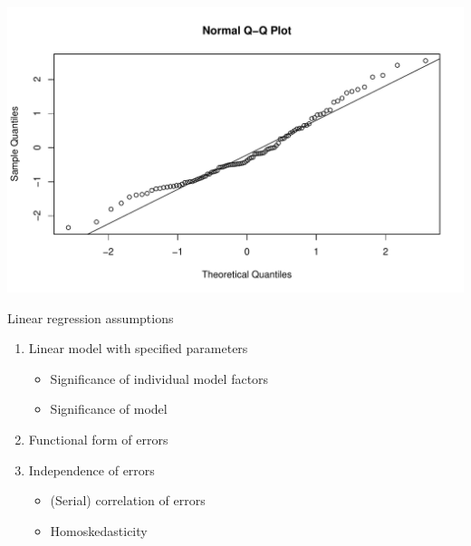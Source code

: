 \documentclass[xcolor=dvipsnames]{beamer}\usepackage{graphicx, color}
\makeatletter
\def\maxwidth{ %
  \ifdim\Gin@nat@width>\linewidth
    \linewidth
  \else
    \Gin@nat@width
  \fi
}
\newenvironment{knitrout}{}{} %
\makeatother
\begin{document}
\begin{frame}[fragile]
\begin{knitrout}
\color{fgcolor}
\includegraphics[width=\maxwidth]{figure/ShapiroWilkPlot2} 

\end{knitrout}

\end{frame}

\begin{frame}[fragile]{Linear regression assumptions}
  \begin{enumerate}
    \item Linear model with specified parameters
      \begin{itemize}
        \item Significance of individual model factors
        \item Significance of model
      \end{itemize}
    \item Functional form of errors
    \item Independence of errors
      \begin{itemize}
        \item \color{blue} (Serial) correlation of errors
        \item \color{black} Homoskedasticity
      \end{itemize}
  \end{enumerate}
\end{frame}
\end{document}
